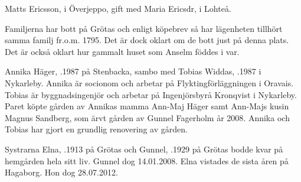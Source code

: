 Matts Ericsson,  i Överjeppo, gift med Maria Ericsdr,  i Lohteå.
\begin{jhchildren}
  \item {}
  \item {}
  \item {}
  \item {}
  \item {}
  \item {}
  \item {}
  \item {}
  \item {}
  \item {}
\end{jhchildren}

Familjerna har bott på Grötas och  enligt köpebrev så har lägenheten tillhört samma familj fr.o.m. 1795. Det är dock oklart om de bott just på denna plats. Det är också oklart hur gammalt huset som Anselm föddes i var.






Annika Häger, .1987 på Stenbacka, sambo med Tobias Widdas, .1987 i Nykarleby. Annika är socionom och arbetar på Flyktingförläggningen i Oravais. Tobias är byggnadsingenjör och arbetar på Ingenjörsbyrå Kronqvist i Nykarleby. Paret köpte gården av Annikas mamma Ann-Maj Häger samt Ann-Majs kusin Magnus Sandberg, som ärvt gården av Gunnel Fagerholm år 2008. Annika och Tobias har gjort en grundlig renovering av gården.


Systrarna Elna, .1913 på Grötas och Gunnel, .1929 på Grötas bodde kvar på hemgården hela sitt liv. Gunnel dog 14.01.2008. Elna vistades de sista åren på Hagaborg. Hon dog 28.07.2012.\jhvspace{}



